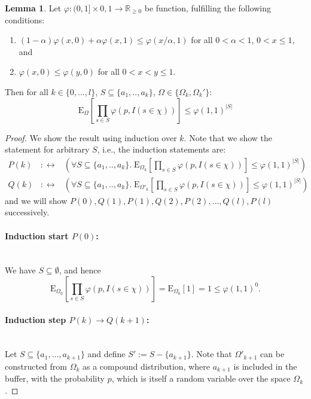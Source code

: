\documentclass{article}
\newcommand{\expectation}{\mathrm{E}}
\renewcommand{\phi}{\varphi}
\theoremstyle{definition}
\newtheorem{lemma}{Lemma}
\begin{document}
\begin{lemma}
\label{le:neg_cor_prelim}
Let $\phi : (0,1] \times {0,1} \rightarrow \mathbb R_{\geq 0}$ be function, fulfilling the following conditions:
\begin{enumerate}
\item \label{cond:phi_1} $(1-\alpha) \phi(x,0) + \alpha \phi(x,1) \leq \phi(x/\alpha,1)$ for all $0 < \alpha < 1$, $0 < x \leq 1$, and
\item \label{cond:phi_2} $\phi(x,0) \leq \phi(y,0)$ for all $0 < x < y \leq 1$.
\end{enumerate}
Then for all 
$k \in \{0,\ldots,l\}$, $S \subseteq \{a_1,..,a_k\}$, $\Omega \in \{\Omega_k,\Omega_k'\}$:
\[
  \expectation_{\Omega}\left[ \prod_{s \in S} \phi(p, I(s \in \chi)) \right] \leq \phi(1,1)^{|S|} 
\]
\end{lemma}
\begin{proof}
We show the result using induction over $k$. Note that we show the statement for arbitrary $S$, i.e., the induction statements are:
\begin{eqnarray*}
P(k) & :\leftrightarrow & \left(\forall S \subseteq \{a_1,..,a_k\}. \; \expectation_{\Omega_k}\left[ \prod_{s \in S} \phi(p, I(s \in \chi)) \right] \leq \phi(1,1)^{|S|} \right) \\
Q(k) & :\leftrightarrow & \left(\forall S \subseteq \{a_1,..,a_k\}. \; \expectation_{\Omega'_k}\left[ \prod_{s \in S} \phi(p, I(s \in \chi)) \right] \leq \phi(1,1)^{|S|} \right)
\end{eqnarray*}
and we will show $P(0),Q(1),P(1),Q(2),P(2),\ldots,Q(l),P(l)$ successively.
\paragraph{Induction start $P(0)$:} \phantom{.}\\
We have $S \subseteq \emptyset$, and hence
\[
\expectation_{\Omega_0}\left[ \prod_{s \in S} \phi(p, I(s \in \chi)) \right] = \expectation_{\Omega_0}\left[1\right] = 1 \leq \phi(1,1)^0 \textrm{.}
\]
\paragraph{Induction step $P(k) \rightarrow Q(k+1)$:} \phantom{.}\\
Let $S \subseteq \{ a_1, \ldots, a_{k+1} \}$ and define $S' := S - \{ a_{k+1} \}$.
Note that $\Omega'_{k+1}$ can be constructed from $\Omega_k$ as a compound distribution, where $a_{k+1}$ is included in the buffer, with the probability $p$, which is itself a random variable over the space $\Omega_k$.


\end{proof}
\end{document}

